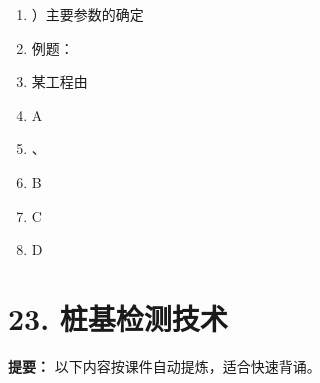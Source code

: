 \documentclass[UTF8,fontset=fandol,11pt]{ctexart}
\begin{document}
\begin{enumerate}[label=\arabic*.]
\item ）主要参数的确定

\item 例题：

\item 某工程由

\item A

\item 、

\item B

\item C

\item D

\end{enumerate}

\newpage

\section*{23. 桩基检测技术}


\begin{mainbox}

\textbf{提要：} 以下内容按课件自动提炼，适合快速背诵。

\end{mainbox}
\end{document}

